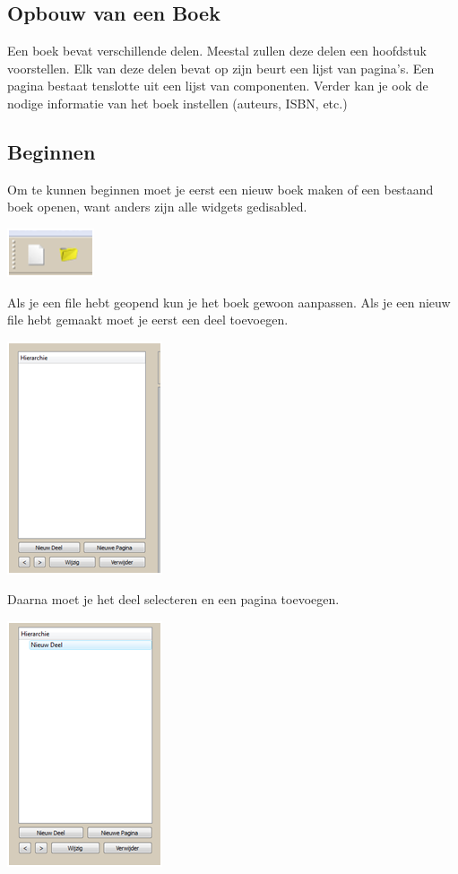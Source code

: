 \documentclass[a4paper,11pt]{article}
\begin{document}
\subsection{Opbouw van een Boek}

Een boek bevat verschillende delen. Meestal zullen deze delen een hoofdstuk voorstellen. Elk van deze delen bevat op zijn
beurt een lijst van pagina's. Een pagina bestaat tenslotte uit een lijst van componenten. Verder kan je ook de nodige
informatie van het boek instellen (auteurs, ISBN, etc.)

\subsection{Beginnen}

Om te kunnen beginnen moet je eerst een nieuw boek maken of een bestaand boek openen, want anders zijn alle widgets gedisabled.

\includegraphics{fig1.png}

Als je een file hebt geopend kun je het boek gewoon aanpassen. Als je een nieuw file hebt gemaakt moet je eerst een deel toevoegen.

\includegraphics{fig2.png}

Daarna moet je het deel selecteren en een pagina  toevoegen.

\includegraphics{fig3.png}
\end{document}
